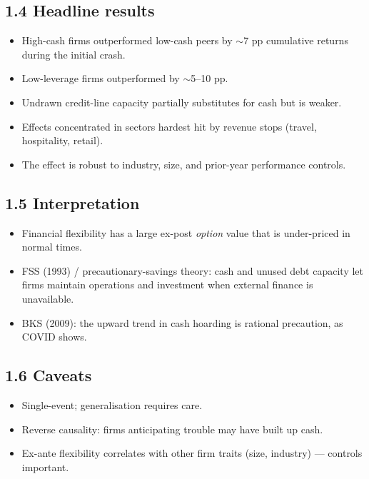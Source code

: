 \documentclass[11pt]{article}
\begin{document}
\subsection*{1.4 Headline results}
\begin{itemize}
\item High-cash firms outperformed low-cash peers by $\sim$7 pp cumulative returns during the initial crash.
\item Low-leverage firms outperformed by $\sim$5--10 pp.
\item Undrawn credit-line capacity partially substitutes for cash but is weaker.
\item Effects concentrated in sectors hardest hit by revenue stops (travel, hospitality, retail).
\item The effect is robust to industry, size, and prior-year performance controls.
\end{itemize}

\subsection*{1.5 Interpretation}
\begin{itemize}
\item Financial flexibility has a large ex-post \emph{option} value that is under-priced in normal times.
\item FSS (1993) / precautionary-savings theory: cash and unused debt capacity let firms maintain operations and investment when external finance is unavailable.
\item BKS (2009): the upward trend in cash hoarding is rational precaution, as COVID shows.
\end{itemize}

\subsection*{1.6 Caveats}
\begin{alertbox}
\begin{itemize}
\item Single-event; generalisation requires care.
\item Reverse causality: firms anticipating trouble may have built up cash.
\item Ex-ante flexibility correlates with other firm traits (size, industry) --- controls important.
\end{itemize}
\end{alertbox}
\end{document}
